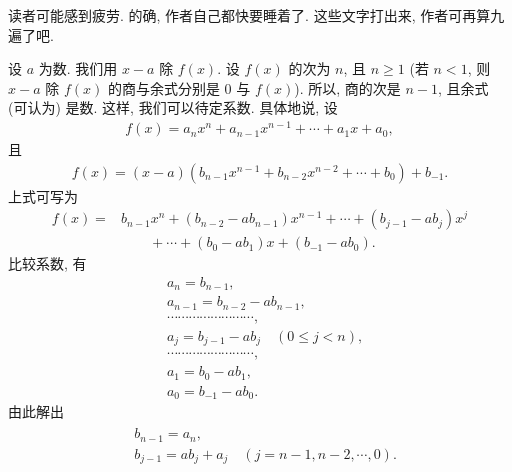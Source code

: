 \begin{example}
    读者可能感到疲劳. 的确, 作者自己都快要睡着了. 这些文字打出来, 作者可再算九遍了吧.
\end{example}

设 $a$ 为数. 我们用 $x-a$ 除 $f(x)$. 设 $f(x)$ 的次为 $n$, 且 $n \geq 1$ (若 $n < 1$, 则 $x-a$ 除 $f(x)$ 的商与余式分别是 $0$ 与 $f(x)$). 所以, 商的次是 $n-1$, 且余式 (可认为) 是数. 这样, 我们可以待定系数. 具体地说, 设
\begin{align*}
    f(x) = a_n x^n + a_{n-1} x^{n-1} + \cdots + a_1 x + a_0,
\end{align*}
且
\begin{align*}
    f(x) = (x - a) (b_{n-1} x^{n-1} + b_{n-2} x^{n-2} + \cdots + b_0) + b_{-1}.
\end{align*}
上式可写为
\begin{align*}
    f(x)
    = {} & b_{n-1} x^n + (b_{n-2} - ab_{n-1}) x^{n-1} + \cdots + (b_{j-1} - ab_j) x^j \\
         & \qquad + \cdots + (b_0 - ab_1) x + (b_{-1} - ab_0).
\end{align*}
比较系数, 有
\begin{align*}
     & a_n = b_{n-1},                                           \\
     & a_{n-1} = b_{n-2} - ab_{n-1},                            \\
     & \cdots \cdots \cdots \cdots \cdots \cdots \cdots \cdots, \\
     & a_j = b_{j-1} - ab_j \quad (0 \leq j < n),               \\
     & \cdots \cdots \cdots \cdots \cdots \cdots \cdots \cdots, \\
     & a_1 = b_0 - ab_1,                                        \\
     & a_0 = b_{-1} - ab_0.
\end{align*}
由此解出
\begin{align*}
    \tag*{(R)} \begin{aligned}
         & b_{n-1} = a_n,                                     \\
         & b_{j-1} = ab_j + a_j \quad (j = n-1,n-2,\cdots,0).
    \end{aligned}
\end{align*}

